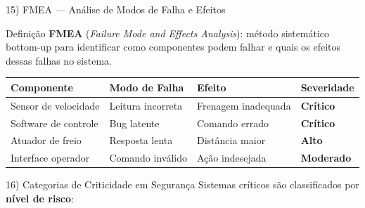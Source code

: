 \documentclass[aspectratio=169]{beamer}
\begin{document}
\begin{frame}{15) FMEA — Análise de Modos de Falha e Efeitos}
  \begin{block}{Definição}
    \textbf{FMEA} (\textit{Failure Mode and Effects Analysis}): método sistemático bottom-up para identificar como componentes podem falhar e quais os efeitos dessas falhas no sistema.
  \end{block}
  \vspace{0.3em}
  \begin{center}
  \begin{tabular}{|l|l|l|l|}
    \hline
    \textbf{Componente} & \textbf{Modo de Falha} & \textbf{Efeito} & \textbf{Severidade} \\
    \hline
    Sensor de velocidade & Leitura incorreta & Frenagem inadequada & \textcolor{meuvermelhoescuro}{\textbf{Crítico}} \\
    \hline
    Software de controle & Bug latente & Comando errado & \textcolor{meuvermelhoescuro}{\textbf{Crítico}} \\
    \hline
    Atuador de freio & Resposta lenta & Distância maior & \textcolor{orange!80!black}{\textbf{Alto}} \\
    \hline
    Interface operador & Comando inválido & Ação indesejada & \textcolor{meuverde}{\textbf{Moderado}} \\
    \hline
  \end{tabular}
  \end{center}
\end{frame}

\begin{frame}{16) Categorias de Criticidade em Segurança}
  Sistemas críticos são classificados por \textbf{nível de risco}:

  \vspace{0.5em}
  \centering
\end{frame}
\end{document}

